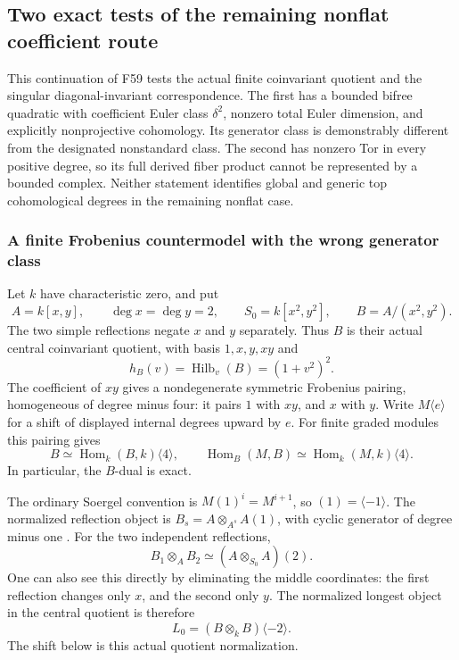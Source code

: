 \documentclass[11pt,a4paper]{article}
\renewcommand{\S}{\ensuremath{\mathsection}}
\newcommand{\fid}[1]{\textsf{#1}}\newcommand{\gate}[1]{\textsf{#1}}
\theoremstyle{named}\newtheorem{finding}{Finding}[section]
\theoremstyle{definition}\newtheorem{definition}[finding]{Definition}
\theoremstyle{remark}\newtheorem{remark}[finding]{Remark}
\begin{document}
\subsection{Two exact tests of the remaining nonflat coefficient route}

This continuation of \fid{F59} tests the actual finite
coinvariant quotient and the singular diagonal-invariant
correspondence. The first has a bounded bifree quadratic
with coefficient Euler class \(\delta^2\), nonzero total
Euler dimension, and explicitly nonprojective cohomology.
Its generator class is demonstrably different from the
designated nonstandard class. The second has nonzero Tor
in every positive degree, so its full derived fiber product
cannot be represented by a bounded complex.
Neither statement identifies global and generic top
cohomological degrees in the remaining nonflat case.

\subsubsection{A finite Frobenius countermodel with the wrong generator class}

Let \(k\) have characteristic zero, and put
\[
 A=k[x,y],\qquad \deg x=\deg y=2,\qquad
 S_0=k[x^2,y^2],\qquad B=A/(x^2,y^2).
\]
The two simple reflections negate \(x\) and \(y\)
separately. Thus \(B\) is their actual central
coinvariant quotient, with basis \(1,x,y,xy\) and
\[
 h_B(v)=\operatorname{Hilb}_v(B)=(1+v^2)^2.
\]
The coefficient of \(xy\) gives a nondegenerate
symmetric Frobenius pairing, homogeneous of degree
minus four: it pairs \(1\) with \(xy\), and \(x\)
with \(y\). Write \(M\langle e\rangle\) for a shift
of displayed internal degrees upward by \(e\).
For finite graded modules this pairing gives
\begin{equation}\label{eq:QRBdual}
 B\simeq\operatorname{Hom}_k(B,k)\langle4\rangle,
 \qquad
 \operatorname{Hom}_B(M,B)
       \simeq\operatorname{Hom}_k(M,k)\langle4\rangle.
\end{equation}
In particular, the \(B\)-dual is exact.

The ordinary Soergel convention is
\(M(1)^i=M^{i+1}\), so \((1)=\langle-1\rangle\).
The normalized reflection object is
\(B_s=A\otimes_{A^s}A(1)\), with cyclic generator
of degree minus one
\cite[\S3.3, p.~1105; \S3.4, p.~1106]{EW}.
For the two independent reflections,
\[
 B_1\otimes_A B_2\simeq(A\otimes_{S_0}A)(2).
\]
One can also see this directly by eliminating the
middle coordinates: the first reflection changes
only \(x\), and the second only \(y\).
The normalized longest object in the central
quotient is therefore
\begin{equation}\label{eq:QRlongest}
                  L_0=(B\otimes_k B)\langle-2\rangle.
\end{equation}
The shift below is this actual quotient normalization.
\end{document}

